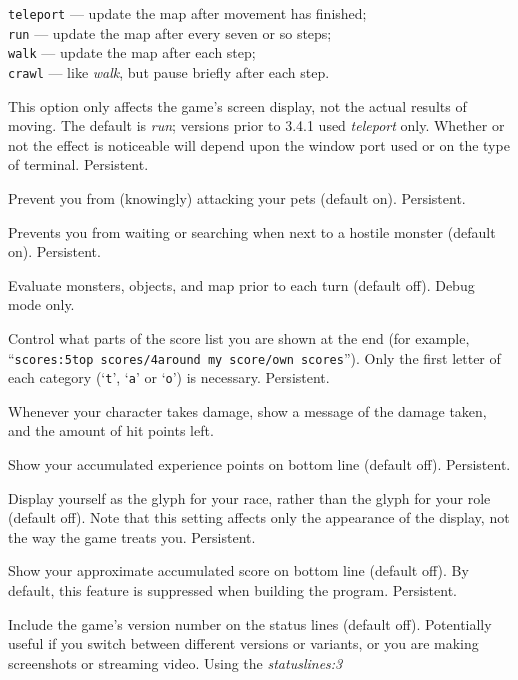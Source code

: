 \documentclass[titlepage]{article}
\begin{document}
\begin{description}[font=\mdseries\itshape]
\texttt{teleport} --- update the map after movement has finished;\\
\texttt{run} --- update the map after every seven or so steps;\\
\texttt{walk} --- update the map after each step;\\
\texttt{crawl} --- like \textit{walk}, but pause briefly after each step.

This option only affects the game's screen display, not the actual
results of moving.  The default is \textit{run}; versions prior to 3.4.1
used \textit{teleport} only.  Whether or not the effect is noticeable will
depend upon the window port used or on the type of terminal.  Persistent.
\item[safe\textunderscore pet]
Prevent you from (knowingly) attacking your pets (default on).  Persistent.
\item[safe\textunderscore wait]
Prevents you from waiting or searching when next to a hostile monster
(default on).  Persistent.
\item[sanity\textunderscore check]
Evaluate monsters, objects, and map prior to each turn (default off).
Debug mode only.
\item[scores]
Control what parts of the score list you are shown at the end (for example,
``\texttt{scores:5top scores/4around my score/own scores}'').  Only the first
letter of each category (`\texttt{t}', `\texttt{a}' or `\texttt{o}') is necessary.
Persistent.
\item[showdamage]
Whenever your character takes damage, show a message of the damage taken,
and the amount of hit points left.
\item[showexp]
Show your accumulated experience points on bottom line (default off).
Persistent.
\item[showrace]
Display yourself as the glyph for your race, rather than the glyph
for your role (default off).  Note that this setting affects only
the appearance of the display, not the way the game treats you.
Persistent.
\item[showscore]
Show your approximate accumulated score on bottom line (default off).
By default, this feature is suppressed when building the program.
Persistent.
\item[showvers]
Include the game's version number on the status lines (default off).
Potentially useful if you switch between different versions or variants,
or you are making screenshots or streaming video.
Using the
\textit{statuslines:3}

\end{description}
\end{document}
